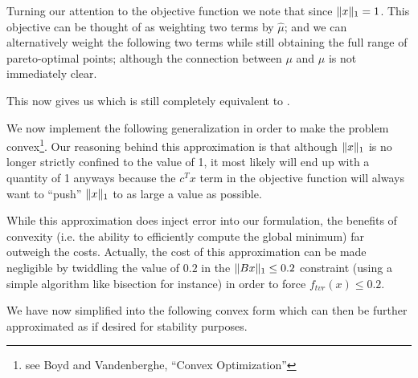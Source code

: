 \documentclass{article}
\begin{document}
    Turning our attention to the objective function we note that
        since $\|x\|_1 = 1$.
    This objective can be thought of as 
        weighting two terms by $\hat{\mu}$;
        and we can alternatively weight the following two terms
        while still obtaining the full range of pareto-optimal points;
        although the connection between $\mu$ and $\hat{\mu}$
        is not immediately clear.

    This now gives us
        which is still completely equivalent to .

    We now implement the following generalization
        in order to make the problem 
        convex\footnote{see Boyd and Vandenberghe, ``Convex Optimization''}.
    Our reasoning behind this approximation
        is that although $\|x\|_1$ is no longer 
        strictly confined to the value of 1,
        it most likely will end up with a quantity of 1 anyways
        because the $c^T x$ term in the objective function will always want
        to ``push'' $\|x\|_1$ to as large a value as possible.

    While this approximation does inject error into our formulation,
        the benefits of convexity (i.e. the ability to efficiently compute
        the global minimum) far outweigh the costs.
    Actually, the cost of this approximation can be made negligible by
        twiddling the value of $0.2$ 
        in the $\|Bx\|_1 \le 0.2$ constraint 
        (using a simple algorithm like bisection for instance)
        in order to force $f_{tvr}(x) \le 0.2$.
    
    We have now simplified  into the following convex form
        which can then be further approximated as 
        if desired for stability purposes.
\end{document}
